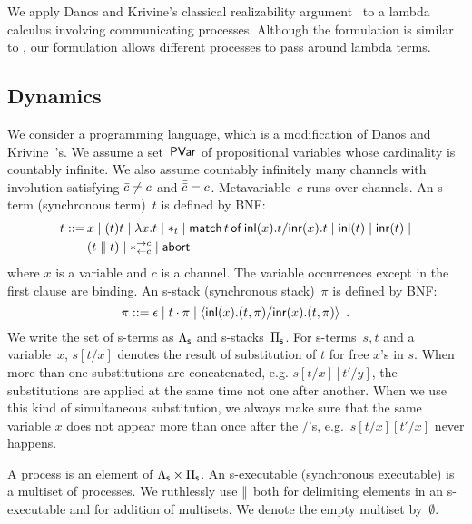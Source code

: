 We apply Danos and Krivine's classical realizability
argument~\citep{danos-krivine} to a
lambda calculus involving
communicating processes.  Although the formulation is similar to
\citep{danos-krivine}, our formulation allows different processes to
pass around lambda terms.

\subsection{Dynamics}
We consider a programming language, which is a modification of
Danos and Krivine~\citep{danos-krivine}'s.
We assume a set~$\mathsf{PVar}$ of propositional variables whose cardinality is
countably infinite.
We also assume countably infinitely many channels with involution
satisfying $\bar{c}\neq c$ and $\bar{\bar{c}} = c$.
Metavariable~$c$ runs over channels.
An s-term (synchronous term)~$t$ is defined by BNF:
\begin{align*}
 t::= \,&x
 \mid (t)t
 \mid \lambda x.t
 \mid \ast_t
 \mid \mathsf{match}\,{t}\,\mathsf{of}\, \mathsf{inl}({x}). {t}/ \mathsf{inr}({x}). {t}
 \mid \mathsf{inl}({t})
 \mid \mathsf{inr}({t})
 \mid \\ &
 (t\parallel t)
 \mid \ast^{\rightarrow {c}}_{\leftarrow{c}}
 \mid \mathsf{abort\,}
\end{align*}
where $x$ is a variable and $c$ is a channel.  The variable occurrences
except in the first clause are binding.
An s-stack (synchronous stack)~$\pi$ is defined by BNF:
\[
 \pi ::= \epsilon
 \mid t\cdot \pi
 \mid \langle \mathsf{inl}({x}). ({t},{\pi})/ \mathsf{inr}({x}). ({t},{\pi})\rangle
 \enspace.
\]
We write the set of s-terms as $\Lambda_{\mathsf s}$ and s-stacks~$\Pi_{\mathsf s}$.
For s-terms~$s,t$ and a variable~$x$, $s[t/x]$ denotes the result of
substitution of $t$ for free $x$'s in $s$.  When more than one
substitutions are concatenated, e.g. $s[t/x][t'/y]$, the substitutions
are applied at the same time not one after another.  When we use this
kind of simultaneous substitution, we always make sure that the same
variable $x$ does not appear more than once after the $/$'s,
e.g.~$s[t/x][t'/x]$ never happens.

A process is an element of $\Lambda_{\mathsf s}\times\Pi_{\mathsf s}$.
An s-executable (synchronous executable)
is a multiset of processes.
We ruthlessly use $\parallel$ both for delimiting elements in an
s-executable and for addition of multisets.
We denote the empty multiset by~$\emptyset$.

